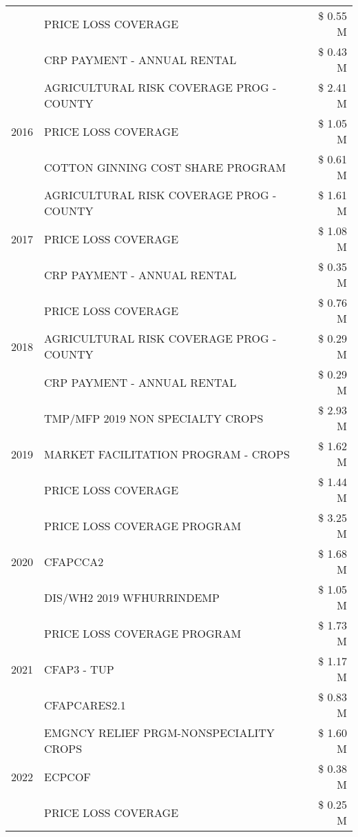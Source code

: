 \begin{tabular}{llr}
 & PRICE LOSS COVERAGE & \$ 0.55 M \\
 & CRP PAYMENT - ANNUAL RENTAL & \$ 0.43 M \\
\cline{1-3}
\multirow[t]{3}{*}{2016} & AGRICULTURAL RISK COVERAGE PROG - COUNTY & \$ 2.41 M \\
 & PRICE LOSS COVERAGE & \$ 1.05 M \\
 & COTTON GINNING COST SHARE PROGRAM & \$ 0.61 M \\
\cline{1-3}
\multirow[t]{3}{*}{2017} & AGRICULTURAL RISK COVERAGE PROG - COUNTY & \$ 1.61 M \\
 & PRICE LOSS COVERAGE & \$ 1.08 M \\
 & CRP PAYMENT - ANNUAL RENTAL & \$ 0.35 M \\
\cline{1-3}
\multirow[t]{3}{*}{2018} & PRICE LOSS COVERAGE & \$ 0.76 M \\
 & AGRICULTURAL RISK COVERAGE PROG - COUNTY & \$ 0.29 M \\
 & CRP PAYMENT - ANNUAL RENTAL & \$ 0.29 M \\
\cline{1-3}
\multirow[t]{3}{*}{2019} & TMP/MFP 2019 NON SPECIALTY CROPS & \$ 2.93 M \\
 & MARKET FACILITATION PROGRAM - CROPS & \$ 1.62 M \\
 & PRICE LOSS COVERAGE & \$ 1.44 M \\
\cline{1-3}
\multirow[t]{3}{*}{2020} & PRICE LOSS COVERAGE PROGRAM & \$ 3.25 M \\
 & CFAPCCA2 & \$ 1.68 M \\
 & DIS/WH2 2019 WFHURRINDEMP & \$ 1.05 M \\
\cline{1-3}
\multirow[t]{3}{*}{2021} & PRICE LOSS COVERAGE PROGRAM & \$ 1.73 M \\
 & CFAP3 - TUP & \$ 1.17 M \\
 & CFAPCARES2.1 & \$ 0.83 M \\
\cline{1-3}
\multirow[t]{3}{*}{2022} & EMGNCY RELIEF PRGM-NONSPECIALITY CROPS & \$ 1.60 M \\
 & ECPCOF & \$ 0.38 M \\
 & PRICE LOSS COVERAGE & \$ 0.25 M \\
\cline{1-3}
\bottomrule
\end{tabular}
